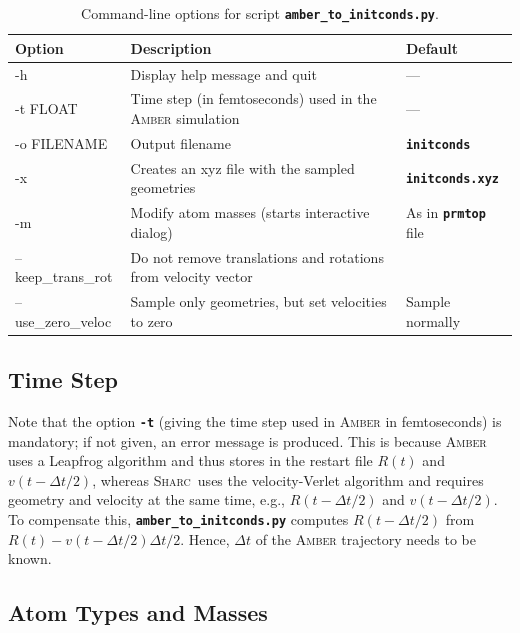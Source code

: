 \documentclass[a4paper,10pt,DIV=15,openany]{scrbook}
\newcommand{\sharc}{\textsc{Sharc}}
\newcommand{\ttt}[1]{\textbf{\texttt{#1}}}
\begin{document}
\begin{table}
  \centering
  \caption{Command-line options for script \ttt{amber\_to\_initconds.py}.}
  \label{tab:amber_opts}
  \begin{tabular}{>{\ttfamily}lp{9cm}l}
    \hline
    \rmfamily Option        &Description      &Default\\
    \hline
    -h                  &Display help message and quit              &---                            \\
    -t  FLOAT           &Time step (in femtoseconds) used in the \textsc{Amber} simulation      &---\\
    -o  FILENAME        &Output filename                            &\ttt{initconds}                \\
    -x                  &Creates an xyz file with the sampled geometries &\ttt{initconds.xyz}       \\
    -m                  &Modify atom masses (starts interactive dialog)  &As in \ttt{prmtop} file   \\
    --keep\_trans\_rot  &Do not remove translations and rotations from velocity vector &\\
    --use\_zero\_veloc  &Sample only geometries, but set velocities to zero     &Sample normally\\
    \hline
  \end{tabular}
\end{table}

\subsection{Time Step}

Note that the option \ttt{-t} (giving the time step used in \textsc{Amber} in femtoseconds) is mandatory; if not given, an error message is produced.
This is because \textsc{Amber} uses a Leapfrog algorithm and thus stores in the restart file $R(t)$ and $v(t-\Delta t/2)$, whereas \sharc\ uses the velocity-Verlet algorithm and requires geometry and velocity at the same time, e.g., $R(t-\Delta t/2)$ and $v(t-\Delta t/2)$.
To compensate this, \ttt{amber\_to\_initconds.py} computes $R(t-\Delta t/2)$ from $R(t)-v(t-\Delta t/2)\Delta t/2$.
Hence, $\Delta t$ of the \textsc{Amber} trajectory needs to be known.

\subsection{Atom Types and Masses}
\end{document}
